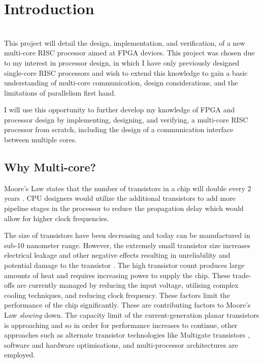\chapter{Introduction}
{%
\startcontents[chapters]
}

\noindent\\
This project will detail the design, implementation, and verification, of a new multi-core RISC processor aimed at FPGA devices. This project was chosen due to my interest in processor design, in which I have only previously designed single-core RISC processors and wish to extend this knowledge to gain a basic understanding of multi-core communication, design considerations, and the limitations of parallelism first hand.

I will use this opportunity to further develop my knowledge of FPGA and processor design by implementing, designing, and verifying, a multi-core RISC processor from scratch, including the design of a communication interface between multiple cores.

\section{Why Multi-core?}

Moore's Law states that the number of transistors in a chip will double every 2 years \cite{}. CPU designers would utilize the  additional transistors to add more pipeline stages in the processor to reduce the propagation delay \cite{} which would allow for higher clock frequencies. 


The size of transistors have been decreasing \cite{} and today can be manufactured in sub-10 nanometer range. However, the extremely small transistor size increases electrical leakage and other negative effects resulting in unreliability and potential damage to the transistor \cite{}.  The high transistor count produces large amounts of heat and requires increasing power to supply the chip. These trade-offs are currently managed by reducing the input voltage, utilising complex cooling techniques, and reducing clock frequency. These factors limit the performance of the chip significantly.
These are contributing factors to Moore's Law \textit{slowing} down. 
The capacity limit of the current-generation planar transistors is approaching and so in order for performance increases to continue, other approaches such as alternate transistor technologies like Multigate transistors \cite{subramanian2010multiple}, software and hardware optimisations, and multi-processor architectures are employed.

